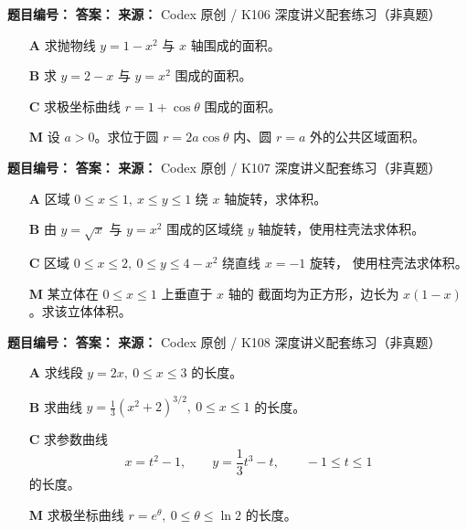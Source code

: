 
\begin{problemBox}
\begin{problemMeta}
\textbf{题目编号：} \quad
\textbf{答案：} \quad
\textbf{来源：} Codex 原创 / K106 深度讲义配套练习（非真题）
\end{problemMeta}
\begin{enumerate}
  \item[\textbf{A}] 求抛物线 \(y=1-x^2\) 与 \(x\) 轴围成的面积。
  \item[\textbf{B}] 求 \(y=2-x\) 与 \(y=x^2\) 围成的面积。
  \item[\textbf{C}] 求极坐标曲线 \(r=1+\cos\theta\) 围成的面积。
  \item[\textbf{M}] 设 \(a>0\)。求位于圆
  \(r=2a\cos\theta\) 内、圆 \(r=a\) 外的公共区域面积。
\end{enumerate}
\end{problemBox}

\begin{problemBox}
\begin{problemMeta}
\textbf{题目编号：} \quad
\textbf{答案：} \quad
\textbf{来源：} Codex 原创 / K107 深度讲义配套练习（非真题）
\end{problemMeta}
\begin{enumerate}
  \item[\textbf{A}] 区域
  \(0\le x\le1,\ x\le y\le1\) 绕 \(x\) 轴旋转，求体积。
  \item[\textbf{B}] 由 \(y=\sqrt x\) 与 \(y=x^2\) 围成的区域绕
  \(y\) 轴旋转，使用柱壳法求体积。
  \item[\textbf{C}] 区域
  \(0\le x\le2,\ 0\le y\le4-x^2\) 绕直线 \(x=-1\) 旋转，
  使用柱壳法求体积。
  \item[\textbf{M}] 某立体在 \(0\le x\le1\) 上垂直于 \(x\) 轴的
  截面均为正方形，边长为 \(x(1-x)\)。求该立体体积。
\end{enumerate}
\end{problemBox}

\begin{problemBox}
\begin{problemMeta}
\textbf{题目编号：} \quad
\textbf{答案：} \quad
\textbf{来源：} Codex 原创 / K108 深度讲义配套练习（非真题）
\end{problemMeta}
\begin{enumerate}
  \item[\textbf{A}] 求线段 \(y=2x,\ 0\le x\le3\) 的长度。
  \item[\textbf{B}] 求曲线
  \(y=\frac13(x^2+2)^{3/2},\ 0\le x\le1\) 的长度。
  \item[\textbf{C}] 求参数曲线
  \[
  x=t^2-1,\qquad y=\frac13t^3-t,\qquad-1\le t\le1
  \]
  的长度。
  \item[\textbf{M}] 求极坐标曲线
  \(r=e^\theta,\ 0\le\theta\le\ln2\) 的长度。
\end{enumerate}
\end{problemBox}

